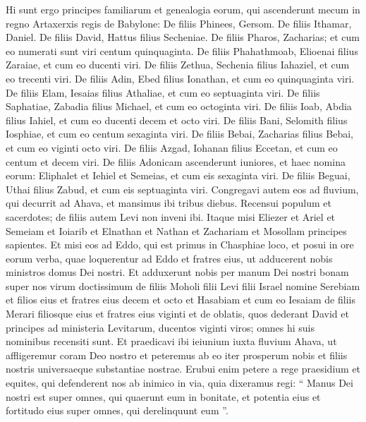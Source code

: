 \begin{biblechapter}
\begin{biblechapter}
\begin{biblechapter}
\begin{biblechapter}
\begin{biblechapter}
\begin{biblechapter}
\begin{biblechapter}
\begin{biblechapter}
\verse Hi sunt ergo principes familiarum et genealogia eorum, qui ascenderunt mecum in regno Artaxerxis regis de Babylone: 
\verse De filiis Phinees, Gersom. De filiis Ithamar, Daniel. De filiis David, Hattus filius Secheniae. 
\verse De filiis Pharos, Zacharias; et cum eo numerati sunt viri centum quinquaginta. 
 \verse De filiis Phahathmoab, Elioenai filius Zaraiae, et cum eo ducenti viri. 
\verse De filiis Zethua, Sechenia filius Iahaziel, et cum eo trecenti viri. 
\verse De filiis Adin, Ebed filius Ionathan, et cum eo quinquaginta viri. 
\verse De filiis Elam, Iesaias filius Athaliae, et cum eo septuaginta viri. 
\verse De filiis Saphatiae, Zabadia filius Michael, et cum eo octoginta viri. 
\verse De filiis Ioab, Abdia filius Iahiel, et cum eo ducenti decem et octo viri. 
\verse De filiis Bani, Selomith filius Iosphiae, et cum eo centum sexaginta viri. 
\verse De filiis Bebai, Zacharias filius Bebai, et cum eo viginti octo viri. 
\verse De filiis Azgad, Iohanan filius Eccetan, et cum eo centum et decem viri. 
\verse De filiis Adonicam ascenderunt iuniores, et haec nomina eorum: Eliphalet et Iehiel et Semeias, et cum eis sexaginta viri. 
\verse De filiis Beguai, Uthai filius Zabud, et cum eis septuaginta viri.
 \verse Congregavi autem eos ad fluvium, qui decurrit ad Ahava, et mansimus ibi tribus diebus. Recensui populum et sacerdotes; de filiis autem Levi non inveni ibi. 
\verse Itaque misi Eliezer et Ariel et Semeiam et Ioiarib et Elnathan et Nathan et Zachariam et Mosollam principes sapientes. 
\verse Et misi eos ad Eddo, qui est primus in Chasphiae loco, et posui in ore eorum verba, quae loquerentur ad Eddo et fratres eius, ut adducerent nobis ministros domus Dei nostri. 
\verse Et adduxerunt nobis per manum Dei nostri bonam super nos virum doctissimum de filiis Moholi filii Levi filii Israel nomine Serebiam et filios eius et fratres eius decem et octo 
\verse et Hasabiam et cum eo Iesaiam de filiis Merari filiosque eius et fratres eius viginti 
\verse et de oblatis, quos dederant David et principes ad ministeria Levitarum, ducentos viginti viros; omnes hi suis nominibus recensiti sunt.
 \verse Et praedicavi ibi ieiunium iuxta fluvium Ahava, ut affligeremur coram Deo nostro et peteremus ab eo iter prosperum nobis et filiis nostris universaeque substantiae nostrae. 
\verse Erubui enim petere a rege praesidium et equites, qui defenderent nos ab inimico in via, quia dixeramus regi: “ Manus Dei nostri est super omnes, qui quaerunt eum in bonitate, et potentia eius et fortitudo eius super omnes, qui derelinquunt eum ”. 

\end{biblechapter}
\end{biblechapter}
\end{biblechapter}
\end{biblechapter}
\end{biblechapter}
\end{biblechapter}
\end{biblechapter}
\end{biblechapter}
